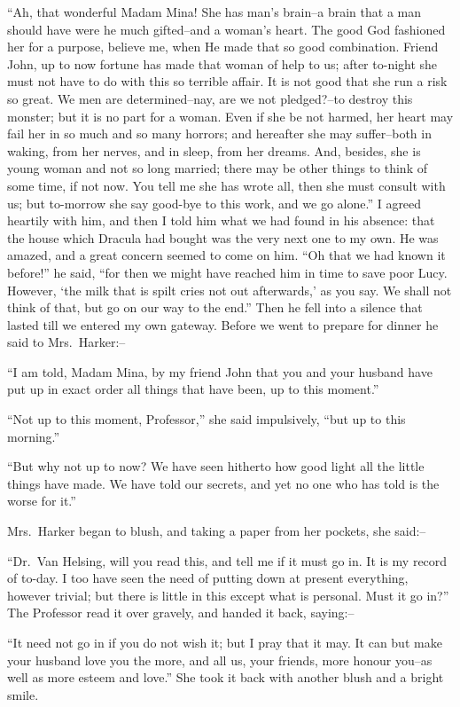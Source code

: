 \documentclass[12pt,openright]{book}
\begin{document}
“Ah, that wonderful Madam Mina! She has man’s brain–a brain that a man should have were he much gifted–and a woman’s heart. The good God fashioned her for a purpose, believe me, when He made that so good combination. Friend John, up to now fortune has made that woman of help to us; after to-night she must not have to do with this so terrible affair. It is not good that she run a risk so great. We men are determined–nay, are we not pledged?–to destroy this monster; but it is no part for a woman. Even if she be not harmed, her heart may fail her in so much and so many horrors; and hereafter she may suffer–both in waking, from her nerves, and in sleep, from her dreams. And, besides, she is young woman and not so long married; there may be other things to think of some time, if not now. You tell me she has wrote all, then she must consult with us; but to-morrow she say good-bye to this work, and we go alone.” I agreed heartily with him, and then I told him what we had found in his absence: that the house which Dracula had bought was the very next one to my own. He was amazed, and a great concern seemed to come on him. “Oh that we had known it before!” he said, “for then we might have reached him in time to save poor Lucy. However, ‘the milk that is spilt cries not out afterwards,’ as you say. We shall not think of that, but go on our way to the end.” Then he fell into a silence that lasted till we entered my own gateway. Before we went to prepare for dinner he said to Mrs. Harker:–

“I am told, Madam Mina, by my friend John that you and your husband have put up in exact order all things that have been, up to this moment.”

“Not up to this moment, Professor,” she said impulsively, “but up to this morning.”

“But why not up to now? We have seen hitherto how good light all the little things have made. We have told our secrets, and yet no one who has told is the worse for it.”

Mrs. Harker began to blush, and taking a paper from her pockets, she said:–

“Dr. Van Helsing, will you read this, and tell me if it must go in. It is my record of to-day. I too have seen the need of putting down at present everything, however trivial; but there is little in this except what is personal. Must it go in?” The Professor read it over gravely, and handed it back, saying:–

“It need not go in if you do not wish it; but I pray that it may. It can but make your husband love you the more, and all us, your friends, more honour you–as well as more esteem and love.” She took it back with another blush and a bright smile.
\end{document}
